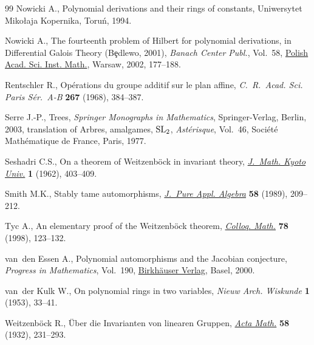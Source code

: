\documentclass[11pt]{article}
\numberwithin{equation}{section}
\let\SourceCedilla\c
\renewcommand{\c}[1]{{\AccentFallback\SourceCedilla{#1}}}
\begin{document}
\begin{thebibliography}{99}
Nowicki A., Polynomial derivations and their rings of constants, Uniwersytet
 Miko{\l}aja Kopernika, Toru\'{n}, 1994.

Nowicki A., The fourteenth problem of {H}ilbert for polynomial derivations, in
 Differential {G}alois {T}heory ({B}\c{e}dlewo, 2001), \textit{Banach Center
 Publ.}, Vol.~58, \href{https://doi.org/10.4064/bc58-0-13}{Polish Acad. Sci. Inst. Math.}, Warsaw, 2002, 177--188.

Rentschler R., Op\'{e}rations du groupe additif sur le plan affine,
 \textit{C.~R.~Acad. Sci. Paris S\'{e}r.~A-B} \textbf{267} (1968), 384--387.

Serre J.-P., Trees, \textit{Springer Monographs in Mathematics}, Springer-Verlag, Berlin,
 2003, translation of Arbres, amalgames, ${\rm SL}_2$,
\textit{Ast\'erisque}, Vol.~46,
Soci\'et\'e Math\'ematique de France, Paris, 1977.

Seshadri C.S., On a theorem of {W}eitzenb\"{o}ck in invariant theory,
 \href{https://doi.org/10.1215/kjm/1250525012}{\textit{J.~Math. Kyoto Univ.}} \textbf{1} (1962), 403--409.

Smith M.K., Stably tame automorphisms, \href{https://doi.org/10.1016/0022-4049(89)90158-8}{\textit{J.~Pure Appl. Algebra}}
 \textbf{58} (1989), 209--212.

Tyc A., An elementary proof of the {W}eitzenb\"{o}ck theorem, \href{https://doi.org/10.4064/cm-78-1-123-132}{\textit{Colloq.
 Math.}} \textbf{78} (1998), 123--132.

van~den Essen A., Polynomial automorphisms and the {J}acobian conjecture,
 \textit{Progress in Mathematics}, Vol.~190, \href{https://doi.org/10.1007/978-3-0348-8440-2}{Birkh\"{a}user Verlag}, Basel,
 2000.

van~der Kulk W., On polynomial rings in two variables, \textit{Nieuw Arch.
 Wiskunde} \textbf{1} (1953), 33--41.

Weitzenb\"{o}ck R., \"{U}ber die {I}nvarianten von linearen {G}ruppen,
 \href{https://doi.org/10.1007/BF02547779}{\textit{Acta Math.}} \textbf{58} (1932), 231--293.

\end{thebibliography}
\end{document}

